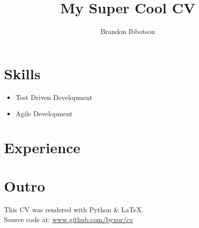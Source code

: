 \documentclass{article}
\author{Brandon Ibbotson}
\title{My Super Cool CV}
\begin{document}
\maketitle
\section{Skills}
\begin{itemize}
 \item Test Driven Development
 \item Agile Development
\end{itemize}
\section{Experience}
\section{Outro}
This CV was rendered with Python \& \LaTeX.\\
Source code at: \url{www.github.com/byxor/cv}
\end{document}
